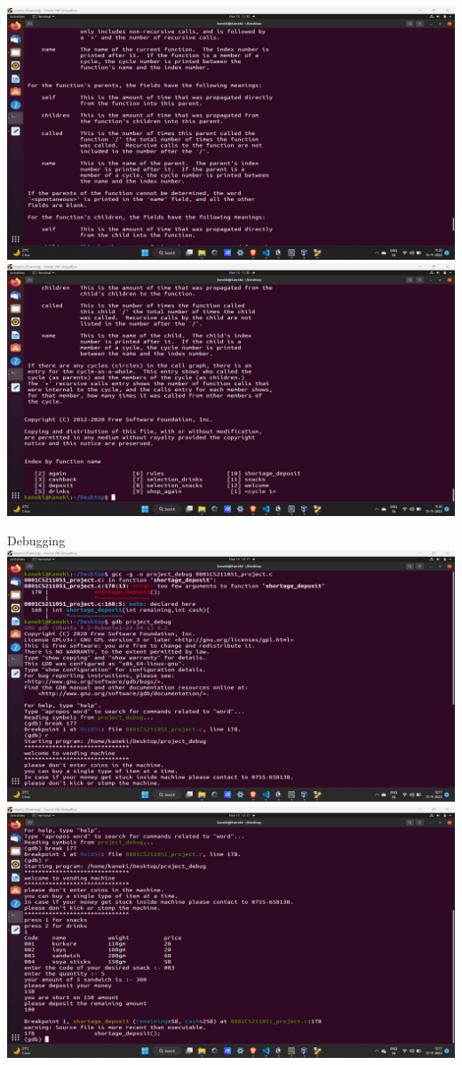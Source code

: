 \documentclass[10pt,a4paper]{article}
\begin{document}
\begin{flushleft}
\begin{center}
\bigskip
\includegraphics[scale=0.3]{report5}\\
\bigskip
\includegraphics[scale=0.3]{report6}
\end{center}
\newpage
\begin{center}
Debugging\\
\bigskip
\includegraphics[scale=0.3]{debugging1}\\
\bigskip
\includegraphics[scale=0.3]{debugging2}

\end{center}
\end{flushleft}
\end{document}
